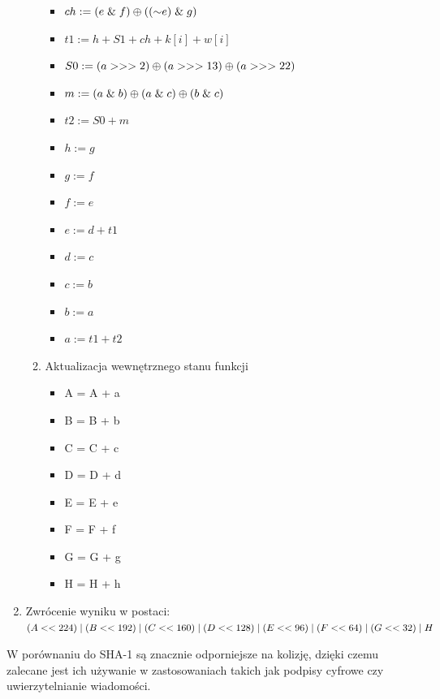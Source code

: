 \begin{enumerate}
\begin{enumerate}
\begin{itemize}
			        \item $ch := (e \mathrel{\&} f) \mathbin{\oplus} ((\mathord{\sim} e) \mathrel{\&} g)$
			        \item $t1 := h + S1 + ch + k[i] + w[i]$
			        \item $S0 := (a >>> 2) \mathbin{\oplus} (a >>> 13) \mathbin{\oplus} (a >>> 22)$
			        \item $m := (a \mathrel{\&} b) \mathbin{\oplus} (a \mathrel{\&} c) \mathbin{\oplus} (b \mathrel{\&} c)$
			        \item $t2 := S0 + m$
			        \item $h := g$
			        \item $g := f$
			        \item $f := e$
			        \item $e := d + t1$
			        \item $d := c$
			        \item $c := b$
			        \item $b := a$
			        \item $a := t1 + t2$
				\end{itemize}
			\item Aktualizacja wewnętrznego stanu funkcji			
				\begin{itemize}
					\item A = A + a
					\item B = B + b
					\item C = C + c
					\item D = D + d
					\item E = E + e
					\item F = F + f
					\item G = G + g
					\item H = H + h
				\end{itemize}
		\end{enumerate}
	\item Zwrócenie wyniku w postaci: \\
		$(A << 224) \mathrel{|} (B << 192) \mathrel{|} (C << 160) \mathrel{|} \\ 
		 (D << 128) \mathrel{|} (E << 96) \mathrel{|} (F << 64) \mathrel{|} (G << 32) \mathrel{|} H$
\end{enumerate}
W porównaniu do SHA-1 są znacznie odporniejsze na kolizję, dzięki czemu zalecane jest ich używanie w zastosowaniach takich jak podpisy cyfrowe czy uwierzytelnianie wiadomości.

